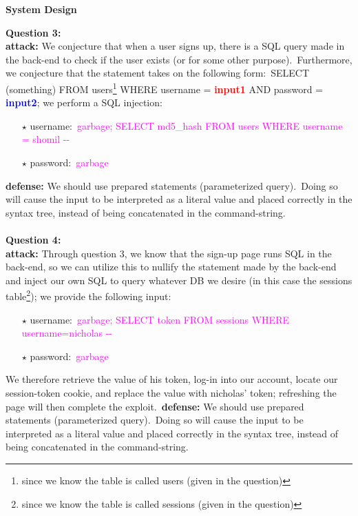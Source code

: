 \documentclass[11pt]{article}
\begin{document}
\begin{center}
{\LARGE \bf System Design}
\end{center}
\sffamily
\noindent
{\textbf{Question 3:}} \\
\textbf{attack:} We conjecture that when a user signs up, there is a SQL query made in the back-end to check if the user exists (or for some other purpose).\ Furthermore, we conjecture that the statement takes on the following form:\ SELECT (something) FROM users\footnote{since we know the table is called users (given in the question)} WHERE username = \textcolor{red}{\textbf{input1}} AND password = \textcolor{blue}{\textbf{input2}}; we perform a SQL injection:
\begin{itemize}
    \item[$\star$] username:\ \textcolor{magenta}{garbage{\textquotesingle}; SELECT md5\_hash FROM users WHERE username = {\textquotesingle}shomil{\textquotesingle} -{}-}
    \item[$\star$] password:\ \textcolor{magenta}{garbage}
\end{itemize}
\noindent   
\textbf{defense:} We should use prepared statements (parameterized query).\ Doing so will cause the input to be interpreted as a literal value and placed correctly in the syntax tree, instead of being concatenated in the command-string.\ \\
\\
\sffamily
\noindent
{\textbf{Question 4:}} \\
\textbf{attack:} Through question 3, we know that the sign-up page runs SQL in the back-end, so we can utilize this to nullify the statement made by the back-end and inject our own SQL to query whatever DB we desire (in this case the sessions table\footnote{since we know the table is called sessions (given in the question)}); we provide the following input:
\begin{itemize}
    \item[$\star$] username:\ \textcolor{magenta}{garbage{\textquotesingle}; SELECT token FROM sessions WHERE username={\textquotesingle}nicholas{\textquotesingle} -{}-}
    \item[$\star$] password:\ \textcolor{magenta}{garbage}
\end{itemize}
We therefore retrieve the value of his token, log-in into our account, locate our session-token cookie, and replace the value with nicholas' token; refreshing the page will then complete the exploit.\ \textbf{defense:} We should use prepared statements (parameterized query).\ Doing so will cause the input to be interpreted as a literal value and placed correctly in the syntax tree, instead of being concatenated in the command-string.\ \\
\end{document}
